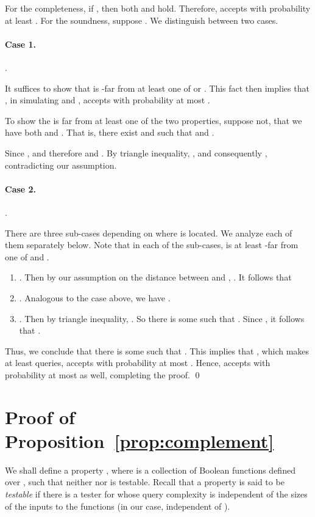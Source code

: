 \documentclass[11pt,english]{article}
\theoremstyle{definition}
\theoremstyle{remark}
\begin{document}
For the completeness, if , then both 
and  hold. Therefore,  accepts with probability at least . 
For the soundness, suppose . We distinguish
between two cases.

\paragraph{Case 1.} . 

It suffices to show that  is -far from at least one of  or . 
This fact then implies that , in simulating  and , accepts  with probability at most 
. 

To show the  is far from at least one of the two properties, suppose not, 
that we have both  and . 
That is, there exist  and  such that 
 and .

Since ,  and
therefore  and .
By triangle inequality, ,
and consequently ,
contradicting our assumption. 

\paragraph{Case 2.} . 

There are three sub-cases depending on where  is located. 
We analyze each of them separately below. Note that in each of the sub-cases, 
 is at least -far from one of  and .
\begin{enumerate}
\item . 
Then by our assumption on the distance
between  and , 
.
It follows that 

 
\item . Analogous to the case above, we have 
.
\item . Then by triangle inequality,
.
So there is some  such that . 
Since , it follows that 
. 
\end{enumerate}
Thus, we conclude that there is some  such that .
This implies that , which makes at least  queries, 
accepts  with probability at most . 
Hence,  accepts  with probability at most  as well, completing the proof. \qed


\section{Proof of Proposition~\ref{prop:complement}}
\label{Sec:complement proof} 

We shall define a property , 
where  is
a collection of Boolean functions defined over , 
such that neither  nor  is testable.
Recall that a property  is said to be \emph{testable} if there
is a tester for  whose query complexity is independent of
the sizes of the inputs to the functions (in our case, 
independent of ).
\end{document}
